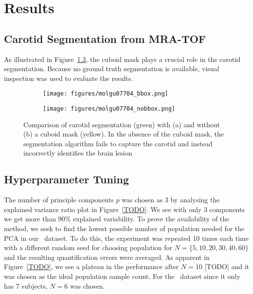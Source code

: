 \chapter{Results}
\section{Carotid Segmentation from MRA-TOF}
As illustrated in Figure~\ref{fig:seg_compare}, the cuboid mask plays a crucial role in the carotid segmentation.
Because no ground truth segmentation is available, visual inspection was used to evaluate the results.
\begin{figure}[h]
	\centering
	\begin{subfigure}{0.45\textwidth}
		\texttt{[image: figures/molgu07704\_bbox.png]}
		\caption{}
		\label{subfig:seg_bbox}
	\end{subfigure}
	\begin{subfigure}{0.45\textwidth}
		\texttt{[image: figures/molgu07704\_nobbox.png]}
		\caption{}
		\label{subfig:seg_nobbox}
	\end{subfigure}
	\caption{Comparison of carotid segmentation (green) with (a) and without (b) a cuboid mask (yellow). In the absence of the cuboid mask, the segmentation algorithm fails to capture the carotid and instead incorrectly identifies the brain lesion}
	\label{fig:seg_compare}
\end{figure}

\section{Hyperparameter Tuning}

The number of principle components $p$ was chosen as 3 by analysing the explained variance ratio plot in Figure~\ref{TODO}.
We see with only 3 components we get more than 90\% explained variability.
To prove the availability of the method, we seek to find the lowest possible number of population needed for the PCA in our \fdg $\,$ dataset.
To do this, the experiment was repeated 10 times each time with a different random seed for choosing population for $N=\{5,10,20,30,40,60\}$ and the resulting quantification errors were averaged.
As apparent in Figure~\ref{TODO}, we see a plateau in the performance after $N=10$ [TODO] and it was chosen as the ideal population sample count.
For the \yohimbine$\,$ dataset since it only has 7 subjects, $N=6$ was chosen.


